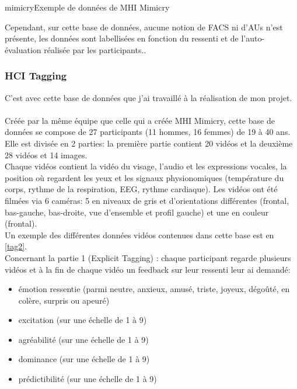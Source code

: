 \documentclass[poster]{polytech/polytech}
\begin{document}
\begin{Figure}{mimicry}{Exemple de données de MHI Mimicry}
\end{Figure}

Cependant, sur cette base de données, aucune notion de FACS ni d'AUs n'est présente, les données sont labellisées en fonction du ressenti et de l'auto-évaluation réalisée par les participants..

\subsubsection{HCI Tagging \cite{tagging1} \cite{tagging2}}
C'est avec cette base de données que j'ai travaillé à la réalisation de mon projet.\\\\
Créée par la même équipe que celle qui a créée MHI Mimicry, cette base de données se compose de 27 participants (11 hommes, 16 femmes) de 19 à 40 ans.\\
Elle est divisée en 2 parties: la première partie contient 20 vidéos et la deuxième 28 vidéos et 14 images.\\
Chaque vidéos contient la vidéo du visage, l'audio et les expressions vocales, la position où regardent les yeux et les signaux physionomiques (température du corps, rythme de la respiration, EEG, rythme cardiaque). Les vidéos ont été filmées via 6 caméras: 5 en niveaux de gris et d'orientations différentes (frontal, bas-gauche, bas-droite, vue d'ensemble et profil gauche) et une en couleur (frontal).\\
Un exemple des différentes données vidéos contenues dans cette base est en \autoref{tag2}.\\
Concernant la partie 1 (Explicit Tagging) : chaque participant regarde plusieurs vidéos et à la fin de chaque vidéo un feedback sur leur ressenti leur ai demandé:
\begin{itemize}
\item émotion ressentie (parmi neutre, anxieux, amusé, triste, joyeux, dégoûté, en colère, surpris ou apeuré)
\item excitation (sur une échelle de 1 à 9)
\item agréabilité (sur une échelle de 1 à 9)
\item dominance (sur une échelle de 1 à 9)
\item prédictibilité (sur une échelle de 1 à 9)
\end{itemize}
\end{document}
